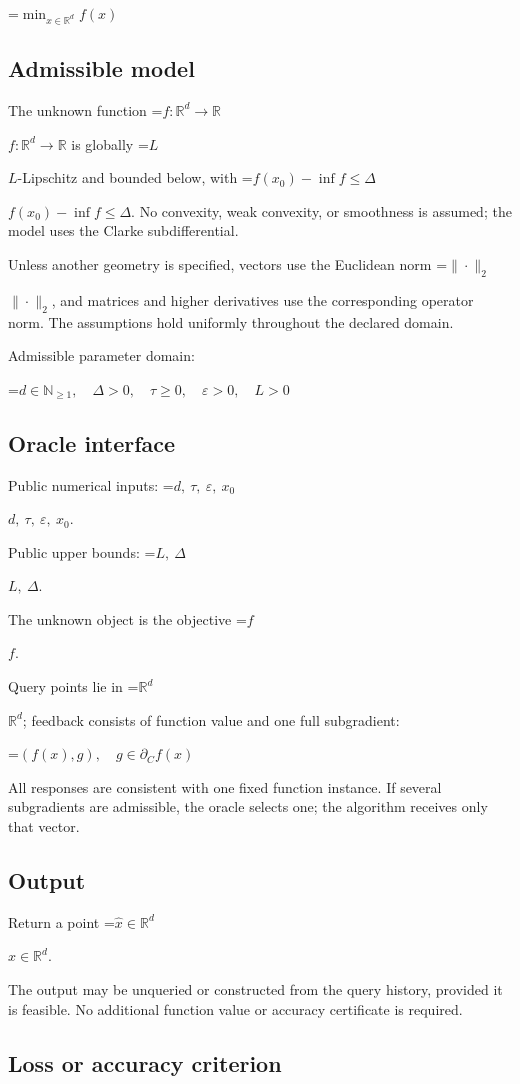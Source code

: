 \documentclass[10pt,a4paper]{article}
\newcommand{\AtlasMath}[1]{\par\begingroup\centering\setbox0=\hbox{$\displaystyle #1$}\ifdim\wd0>1.4\linewidth\typeout{ATLAS WIDE FORMULA: \the\wd0}\fi\ifdim\wd0>\linewidth\resizebox{\linewidth}{!}{\box0}\else\box0\fi\par\endgroup}
\newcommand{\AtlasInlineMath}[1]{\begingroup\setbox0=\hbox{$#1$}\ifdim\wd0>.4\linewidth\endgroup\AtlasMath{#1}\else\endgroup$#1$\fi}
\begin{document}
\AtlasMath{\min_{x\in \mathbb{R}^d}f(x)}


\subsection{Admissible model}
The unknown function \AtlasInlineMath{f:\mathbb R^d\to\mathbb R} is globally \AtlasInlineMath{L}-Lipschitz and bounded below, with \AtlasInlineMath{f(x_0)-\inf f\le\Delta}. No convexity, weak convexity, or smoothness is assumed; the model uses the Clarke subdifferential.

Unless another geometry is specified, vectors use the Euclidean norm \AtlasInlineMath{\|\cdot\|_2}, and matrices and higher derivatives use the corresponding operator norm. The assumptions hold uniformly throughout the declared domain.

Admissible parameter domain:


\AtlasMath{d\in\mathbb{N}_{\ge1},\quad \Delta>0,\quad \tau\ge0,\quad \varepsilon>0,\quad L>0}


\subsection{Oracle interface}
Public numerical inputs: \AtlasInlineMath{d,\ \tau,\ \varepsilon,\ x_0}.

Public upper bounds: \AtlasInlineMath{L,\ \Delta}.

The unknown object is the objective \AtlasInlineMath{f}.

Query points lie in \AtlasInlineMath{\mathbb{R}^d}; feedback consists of function value and one full subgradient:


\AtlasMath{(f(x),g),\quad g\in\partial_C f(x)}


All responses are consistent with one fixed function instance. If several subgradients are admissible, the oracle selects one; the algorithm receives only that vector.

\subsection{Output}
Return a point \AtlasInlineMath{\widehat x\in\mathbb R^d}.

The output may be unqueried or constructed from the query history, provided it is feasible. No additional function value or accuracy certificate is required.

\subsection{Loss or accuracy criterion}
\end{document}
